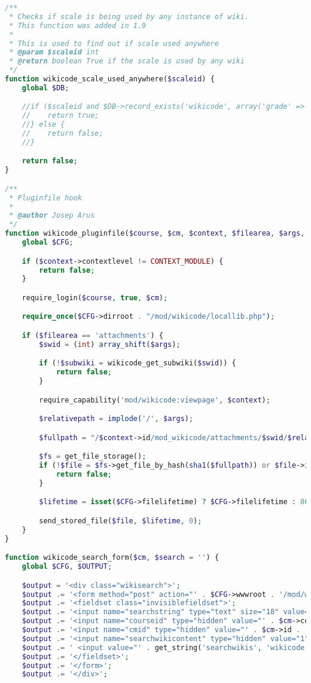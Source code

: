 \begin{lstlisting}[language=PHP]
/**
 * Checks if scale is being used by any instance of wiki.
 * This function was added in 1.9
 *
 * This is used to find out if scale used anywhere
 * @param $scaleid int
 * @return boolean True if the scale is used by any wiki
 */
function wikicode_scale_used_anywhere($scaleid) {
    global $DB;

    //if ($scaleid and $DB->record_exists('wikicode', array('grade' => -$scaleid))) {
    //    return true;
    //} else {
    //    return false;
    //}

    return false;
}

/**
 * Pluginfile hook
 *
 * @author Josep Arus
 */
function wikicode_pluginfile($course, $cm, $context, $filearea, $args, $forcedownload) {
    global $CFG;

    if ($context->contextlevel != CONTEXT_MODULE) {
        return false;
    }

    require_login($course, true, $cm);

    require_once($CFG->dirroot . "/mod/wikicode/locallib.php");

    if ($filearea == 'attachments') {
        $swid = (int) array_shift($args);

        if (!$subwiki = wikicode_get_subwiki($swid)) {
            return false;
        }

        require_capability('mod/wikicode:viewpage', $context);

        $relativepath = implode('/', $args);

        $fullpath = "/$context->id/mod_wikicode/attachments/$swid/$relativepath";

        $fs = get_file_storage();
        if (!$file = $fs->get_file_by_hash(sha1($fullpath)) or $file->is_directory()) {
            return false;
        }

        $lifetime = isset($CFG->filelifetime) ? $CFG->filelifetime : 86400;

        send_stored_file($file, $lifetime, 0);
    }
}

function wikicode_search_form($cm, $search = '') {
    global $CFG, $OUTPUT;

    $output = '<div class="wikisearch">';
    $output .= '<form method="post" action="' . $CFG->wwwroot . '/mod/wikicode/search.php" style="display:inline">';
    $output .= '<fieldset class="invisiblefieldset">';
    $output .= '<input name="searchstring" type="text" size="18" value="' . s($search, true) . '" alt="search" />';
    $output .= '<input name="courseid" type="hidden" value="' . $cm->course . '" />';
    $output .= '<input name="cmid" type="hidden" value="' . $cm->id . '" />';
    $output .= '<input name="searchwikicontent" type="hidden" value="1" />';
    $output .= ' <input value="' . get_string('searchwikis', 'wikicode') . '" type="submit" />';
    $output .= '</fieldset>';
    $output .= '</form>';
    $output .= '</div>';


\end{lstlisting}
